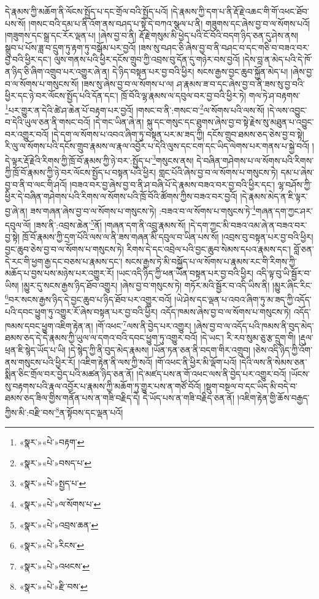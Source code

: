 དེ་རྣམས་ཀྱི་མཆོག་ནི་ལོངས་སྤྱོད་པ་དང་གྲོལ་བའི་སྤྱོད་པའོ། །དེ་རྣམས་ཀྱི་དག་པ་ནི་རྡོ་རྗེ་འཆང་གི་གོ་འཕང་ཐོབ་པས་སོ། །གསང་བའི་དམ་པ་ནི་འོག་ནས་བཤད་པ་སྟེ་དེ་བཀའ་སྩལ་པ་ནི། གཟུགས་དང་ཞེས་བྱ་བ་ལ་སོགས་པའོ། །གཟུགས་དང་སྒྲ་དང་རོར་ལྡན་པ། །ཞེས་བྱ་བ་ནི། རྡོ་རྗེ་གསུམ་མི་ཕྱེད་པའི་ངོ་བོའི་བདག་ཉིད་ཅན་དུ་ཤེས་ནས། སྒྲུབ་པ་པོས་ཟླ་བ་དྲུག་ཏུ་རྟག་ཏུ་བསྒོམ་པར་བྱའོ། །ཟས་སུ་བཤང་ཅི་ཞེས་བྱ་བ་ནི་བཤང་བ་དང་གཅི་བ་བཟའ་བར་བྱ་བའི་ཕྱིར་དང་། ལུས་གནས་པའི་ཕྱིར་དངོས་གྲུབ་ཀྱི་འབྲས་བུ་དོན་དུ་གཉེར་བས་བྱའོ། །དེས་བླ་ན་མེད་པའི་དེ་ཁོ་ན་ཉིད་ཅི་ཞིག་འགྲུབ་པར་འགྱུར་ཞེ་ན། དེ་ཉིད་བསྟན་པར་བྱ་བའི་ཕྱིར། སངས་རྒྱས་བྱང་ཆུབ་སྐྱོན་མེད་པ། །ཞེས་བྱ་བ་ལ་སོགས་པ་གསུངས་སོ། །ཟས་སུ་ཞེས་བྱ་བ་ལ་སོགས་པ་ལ། ཤ་རྣམས་ཟ་བ་དང་ཞེས་བྱ་བ་ནི་ཟས་སུ་བྱ་བའི་ཕྱིར་དང་ཉེ་བར་ལོངས་སྤྱོད་པའི་དོན་དང་། ཁྲོ་བོའི་ལྷ་རྣམས་ལ་དབུལ་བར་བྱ་བའི་ཕྱིར་ཏེ། གལ་ཏེ་ཤ་བརྟགས་\footnote{«སྣར་»«པེ་»བརྟག་}པར་གྱུར་ན་དེའི་ཚེ་ཤ་ཆེན་པོ་བརྟག་པར་བྱའོ། །གསང་བ་ནི་:གསང་བ་\footnote{«སྣར་»«པེ་»བསད་པ་}ལ་སོགས་པའི་ལས་སོ། །དེ་ལས་འབྱུང་བ་དེའི་ཡུལ་ཅན་ནི་གསང་བའོ། །དེ་གང་ཡིན་ཞེ་ན། སྐུ་དང་གསུང་དང་ཐུགས་ཞེས་བྱ་བ་སྟེ་རྗེས་སུ་མཐུན་པ་འབྱུང་བར་འགྱུར་བའོ། །དེ་དག་ལ་སོགས་པ་འབའ་ཞིག་ཏུ་བསྟན་པར་མ་ཟད་ཀྱི། དངོས་གྲུབ་ཐམས་ཅད་ཅེས་བྱ་བ་སྟེ། རི་ལུ་ལ་སོགས་པའི་དངོས་གྲུབ་རྣམས་ལ་རྣལ་འབྱོར་པ་དེའི་ལུས་དང་ངག་དང་ཡིད་ལེགས་པར་གནས་པ་སྐྱེ་བའོ། །དེ་ལྟར་རྡོ་རྗེའི་རིགས་ཀྱི་ཁྲོ་བོ་རྣམས་ཀྱི་ཉེ་བར་:སྤྱོད་པ་\footnote{«སྣར་»«པེ་»སྤྱད་པ་}གསུངས་ནས། དེ་བཞིན་གཤེགས་པ་ལ་སོགས་པའི་རིགས་ཀྱི་ཁྲོ་བོ་རྣམས་ཀྱི་ཉེ་བར་ལོངས་སྤྱོད་པ་བསྟན་པའི་ཕྱིར། གླང་པོའི་ཞེས་བྱ་བ་ལ་སོགས་པ་གསུངས་ཏེ། དམ་པ་ཞེས་བྱ་བ་ནི་བ་ལང་གི་ཤའོ། །བཟའ་བར་བྱ་ཞེས་བྱ་བ་ནི་ཤ་བཞི་པོ་དེ་རྣམས་བཟའ་བར་བྱ་བའི་ཕྱིར་དང་། ལྷ་བཤོས་ཀྱི་ཕྱིར་དེ་བཞིན་གཤེགས་པའི་རིགས་ལ་སོགས་པའི་ཁྲོ་བོའི་ཚོགས་ཀྱིས་བཟའ་བར་བྱའོ། །དེ་རྣམས་མེད་ན་ཇི་ལྟར་བྱ་ཞེ་ན། ཟས་གཞན་ཞེས་བྱ་བ་ལ་སོགས་པ་གསུངས་ཏེ། :བཟའ་བ་ལ་སོགས་པ་གསུངས་ཏེ་\footnote{«སྣར་»«པེ་»ལ་སོགས་པ་}གཞན་དག་ཀྱང་ཤར་དབུལ་ལོ། །ཟས་ནི་:འབྲས་ཆེན་\footnote{«སྣར་»«པེ་»འབྲས་ཆན་}ནོ། །གཞན་དག་ནི་འབྲུ་རྣམས་སོ། །དེ་དག་ཀྱང་མི་བཟའ་འམ་ཞེ་ན་བཟའ་བར་བྱ་སྟེ། ཁྲོ་བོ་རྣམས་ཀྱི་དྲག་པོའི་ལས་ལ་ནི་ཟས་གཞན་མི་དབུལ་བ་ཡིན་པས་སོ། །འབྲས་བུ་བསྟན་པར་བྱ་བའི་ཕྱིར། བྱང་ཆུབ་ཅེས་བྱ་བ་ལ་སོགས་པ་གསུངས་ཏེ། རིགས་དེ་དང་འབྲེལ་པའི་བྱང་ཆུབ་སེམས་དཔའ་རྣམས་དང་། བློ་ཅན་དེ་རང་གི་ཕྱག་རྒྱ་དང་བཅས་པ་རྣམས་དང་། སངས་རྒྱས་ཏེ་མི་བསྐྱོད་པ་ལ་སོགས་པ་རྣམས་རང་གི་རིགས་ཀྱི་མཆོད་པ་བྱས་པས་མཉེས་པར་འགྱུར་རོ། །ཡང་འདི་ཉིད་ཀྱི་ཕན་ཡོན་བསྟན་པར་བྱ་བའི་ཕྱིར། འདི་ལྟ་བུ་ཡི་སྦྱོར་བ་ཡིས། །མྱུར་དུ་སངས་རྒྱས་ཉིད་ཐོབ་འགྱུར། །ཞེས་བྱ་བ་གསུངས་ཏེ། གཏོར་མའི་སྦྱོར་བ་འདི་ཡིས་ནི། །མྱུར་ཞིང་རིང་\footnote{«སྣར་»«པེ་»རིངས་}བར་སངས་རྒྱས་ཉིད་དེ་བྱང་ཆུབ་པ་ཉིད་ཐོབ་པར་འགྱུར་བའོ། །ཡེ་ཤེས་དང་ལྡན་པ་འབའ་ཞིག་ཏུ་མ་ཟད་ཀྱི་འདོད་པའི་དབང་ཕྱུག་ཏུ་འགྱུར་རོ་ཞེས་བསྟན་པར་བྱ་བའི་ཕྱིར། འདོད་ཁམས་ཞེས་བྱ་བ་ལ་སོགས་པ་གསུངས་ཏེ། འདོད་ཁམས་དབང་ཕྱུག་འཇིག་རྟེན་ན། །གོ་འཕང་\footnote{«སྣར་»«པེ་»འཕངས་}ལས་ནི་བྱེད་པར་འགྱུར། །ཞེས་བྱ་བ་ལ་འདོད་པའི་ཁམས་ནི་བུད་མེད་ཐམས་ཅད་དེ་དེ་རྣམས་ཀྱི་ཡུལ་ལ་དགའ་བའི་དབང་ཕྱུག་ཏུ་འགྱུར་བའོ། །དེ་ཡང་། རི་རབ་སུམ་ཅུ་རྩ་དྲུག་གི། །རྡུལ་ཕྲན་ཇི་སྙེད་ཡོད་པ་ཡི། །དེ་སྙེད་ཀྱི་ནི་བུད་མེད་རྣམས། །ཡོན་ཏན་ཅན་ནི་བདག་གིར་འགྲུབ། །ཅེས་འདི་ཉིད་ཀྱི་འོག་ནས་གསུངས་པའི་ཕྱིར་རོ། །འཇིག་རྟེན་ནི་ལས་ཀྱི་སའོ། །གོ་འཕང་ནི་ཕྱིར་མི་ལྡོག་པའོ། །དེའི་ལས་ནི་སེམས་ཅན་སྨིན་ཅིང་གྲོལ་བར་བྱེད་པའི་མཚན་ཉིད་ཅན་ནོ། །དེ་མཛད་པས་ན་གོ་འཕང་ལས་ནི་བྱེད་པར་འགྱུར་བའོ། །ཡོངས་སུ་བརྟགས་པའི་རྣལ་འབྱོར་པ་རྣམས་ཀྱི་མཆོག་ཏུ་གྱུར་པས་ན་གཙོ་བོའོ། །སྡུག་བསྔལ་བ་དང་ཡིད་མི་བདེ་བ་ཐམས་ཅད་ཟིལ་གྱིས་གནོན་པས་ན་གཟི་བརྗིད་དེ། དེ་ཡོད་པས་ན་གཟི་བརྗིད་ཅན་ནོ། །འཇིག་རྟེན་གྱི་ཆོས་བརྒྱད་ཀྱིས་མི་:བརྫི་བས་\footnote{«སྣར་»«པེ་»རྫི་བས་}ན་སྟོབས་དང་ལྡན་པའོ། 